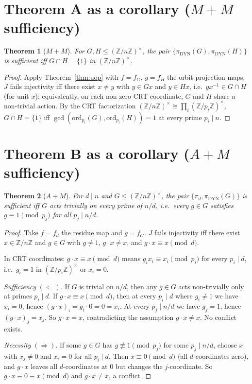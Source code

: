 \documentclass[11pt,reqno]{amsart}
\theoremstyle{plain}
\newtheorem{theorem}{Theorem}
\theoremstyle{definition}
\newcommand{\Z}{\mathbb{Z}}
\newcommand{\Zn}{\Z/n\Z}
\newcommand{\Zns}{(\Z/n\Z)^{\times}}
\newcommand{\DYN}{\mathrm{DYN}}
\newcommand{\ord}{\mathrm{ord}}
\begin{document}
\section{Theorem A as a corollary ($M{+}M$ sufficiency)} \label{sec:mm}

\begin{theorem}[$M{+}M$] \label{thm:A}
For $G,H \leq \Zns$, the pair $\{\pi_{\DYN}(G), \pi_{\DYN}(H)\}$ is sufficient iff $G \cap H = \{1\}$ in $\Zns$.
\end{theorem}

\begin{proof}
Apply Theorem~\ref{thm:uop} with $f = f_G$, $g = f_H$ the orbit-projection maps. $J$ fails injectivity iff there exist $x \neq y$ with $y \in Gx$ and $y \in Hx$, i.e.\ $y x^{-1} \in G \cap H$ (for unit $x$); equivalently, on each non-zero CRT coordinate, $G$ and $H$ share a non-trivial action. By the CRT factorization $\Zns \cong \prod_i (\Z/p_i\Z)^{\times}$, $G \cap H = \{1\}$ iff $\gcd(\ord_{p_i}(G), \ord_{p_i}(H)) = 1$ at every prime $p_i \mid n$.
\end{proof}

\section{Theorem B as a corollary ($A{+}M$ sufficiency)} \label{sec:am}

\begin{theorem}[$A{+}M$] \label{thm:B}
For $d \mid n$ and $G \leq \Zns$, the pair $\{\pi_d, \pi_{\DYN}(G)\}$ is sufficient iff $G$ acts trivially on every prime of $n/d$, i.e.\ every $g \in G$ satisfies $g \equiv 1 \pmod{p_j}$ for all $p_j \mid n/d$.
\end{theorem}

\begin{proof}
Take $f = f_d$ the residue map and $g = f_G$. $J$ fails injectivity iff there exist $x \in \Zn$ and $g \in G$ with $g \neq 1$, $g \cdot x \neq x$, and $g \cdot x \equiv x \pmod d$.

In CRT coordinates: $g \cdot x \equiv x \pmod d$ means $g_i x_i \equiv x_i \pmod{p_i}$ for every $p_i \mid d$, i.e.\ $g_i = 1$ in $(\Z/p_i\Z)^{\times}$ or $x_i = 0$.

\emph{Sufficiency} $(\Leftarrow)$. If $G$ is trivial on $n/d$, then any $g \in G$ acts non-trivially only at primes $p_i \mid d$. If $g \cdot x \equiv x \pmod d$, then at every $p_i \mid d$ where $g_i \neq 1$ we have $x_i = 0$, hence $(g \cdot x)_i = g_i \cdot 0 = 0 = x_i$. At every $p_j \mid n/d$ we have $g_j = 1$, hence $(g \cdot x)_j = x_j$. So $g \cdot x = x$, contradicting the assumption $g \cdot x \neq x$. No conflict exists.

\emph{Necessity} $(\Rightarrow)$. If some $g \in G$ has $g \not\equiv 1 \pmod{p_j}$ for some $p_j \mid n/d$, choose $x$ with $x_j \neq 0$ and $x_i = 0$ for all $p_i \mid d$. Then $x \equiv 0 \pmod d$ (all $d$-coordinates zero), and $g \cdot x$ leaves all $d$-coordinates at $0$ but changes the $j$-coordinate. So $g \cdot x \equiv 0 \equiv x \pmod d$ and $g \cdot x \neq x$, a conflict.
\end{proof}
\end{document}
